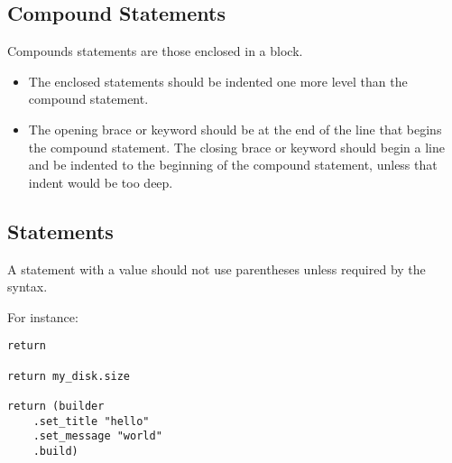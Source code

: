 \subsection{Compound Statements}

Compounds statements are those enclosed in a block. 
\begin{itemize}
\item The enclosed statements should be indented one more level than the compound statement. 
\item The opening brace or keyword should be at the end of the line that begins the compound statement. The closing brace or keyword should begin a line and be indented to the beginning of the compound statement, unless that indent would be too deep. 
\end{itemize}





\subsection{ Statements}

A  statement with a value should not use parentheses unless required by the syntax.

\example For instance: 
\begin{lstlisting}
return

return my_disk.size

return (builder
    .set_title "hello"
    .set_message "world"
    .build)
\end{lstlisting}














